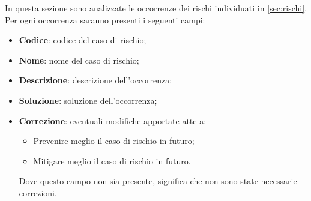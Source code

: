 In questa sezione sono analizzate le occorrenze dei rischi individuati in \cref{sec:rischi}. Per ogni occorrenza saranno presenti i seguenti campi:
\begin{itemize}
	\item \textbf{Codice}: codice del caso di rischio;
	\item \textbf{Nome}: nome del caso di rischio;
	\item \textbf{Descrizione}: descrizione dell'occorrenza;
	\item \textbf{Soluzione}: soluzione dell'occorrenza;
	\item \textbf{Correzione}: eventuali modifiche apportate atte a:
			\begin{itemize}
				\item Prevenire meglio il caso di rischio in futuro;
				\item Mitigare meglio il caso di rischio in futuro.
			\end{itemize}
			Dove questo campo non sia presente, significa che non sono state necessarie correzioni.
\end{itemize}
